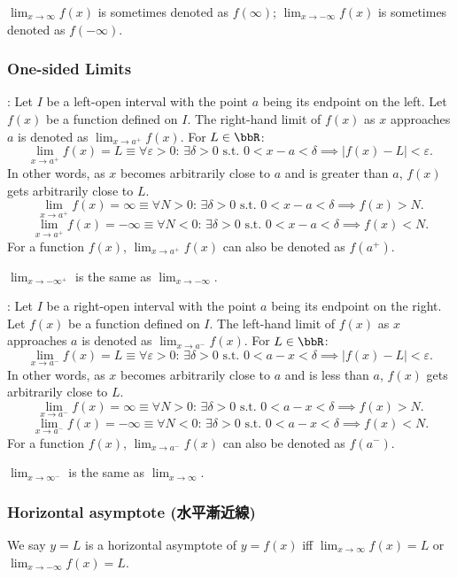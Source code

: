 \documentclass[a4paper,12pt]{report}
\begin{document}
$\lim_{x\to\infty}f(x)$ is sometimes denoted as $f(\infty)$; $\lim_{x\to-\infty}f(x)$ is sometimes denoted as $f(-\infty)$.
\subsubsection{One-sided Limits}
: Let \(I\) be a left-open interval with the point \(a\) being its endpoint on the left. Let \( f(x) \) be a function defined on \(I\). The right-hand limit of \( f(x) \) as \( x \) approaches \( a \) is denoted as $\lim_{x \to a^+} f(x)$. For $L\in\bbR$:
\[\lim_{x \to a^+} f(x) = L \equiv \forall \varepsilon > 0 :\,\exists \delta > 0 \text{\ s.t.\ } 0 < x - a < \delta \implies |f(x) - L| < \varepsilon.\]
In other words, as \(x\) becomes arbitrarily close to \(a\) and is greater than \(a\), \(f(x)\) gets arbitrarily close to \(L\).
\[\lim_{x\to a^+}f(x)=\infty \equiv \forall N > 0:\, \exists \delta > 0 \text{\ s.t.\ } 0 < x - a < \delta \implies f(x) > N.\]
\[\lim_{x\to a^+}f(x)=-\infty \equiv \forall N < 0:\, \exists \delta > 0 \text{\ s.t.\ } 0 < x - a < \delta \implies f(x) < N.\]
For a function $f(x)$, $\lim_{x\to a^+}f(x)$ can also be denoted as $f(a^+)$.

$\lim_{x\to-\infty^+}$ is the same as $\lim_{x\to-\infty}$.

: Let \(I\) be a right-open interval with the point \(a\) being its endpoint on the right. Let \( f(x) \) be a function defined on \(I\). The left-hand limit of \( f(x) \) as \( x \) approaches \( a \) is denoted as $\lim_{x \to a^-} f(x)$. For $L\in\bbR$:
\[\lim_{x \to a^-} f(x) = L \equiv \forall \varepsilon > 0 :\,\exists \delta > 0 \text{\ s.t.\ } 0 < a - x < \delta \implies |f(x) - L| < \varepsilon.\]
In other words, as \(x\) becomes arbitrarily close to \(a\) and is less than \(a\), \(f(x)\) gets arbitrarily close to \(L\).
\[\lim_{x\to a^-}f(x)=\infty \equiv \forall N > 0:\, \exists \delta > 0 \text{\ s.t.\ } 0 < a - x < \delta \implies f(x) > N.\]
\[\lim_{x\to a^-}f(x)=-\infty \equiv \forall N < 0:\, \exists \delta > 0 \text{\ s.t.\ } 0 < a - x < \delta \implies f(x) < N.\]
For a function $f(x)$, $\lim_{x\to a^-}f(x)$ can also be denoted as $f(a^-)$.

$\lim_{x\to\infty^-}$ is the same as $\lim_{x\to\infty}$.
\subsubsection{Horizontal asymptote (水平漸近線)}
We say $y=L$ is a horizontal asymptote of $y=f(x)$ iff $\lim_{x \to \infty} f(x)=L$ or $\lim_{x \to -\infty} f(x)=L$.
\end{document}
